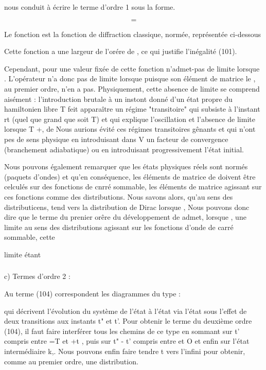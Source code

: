 nous conduit à écrire le terme d'ordre 1 sous la forme.

\[
\tag{103}=
\]

Le fonction  est la fonction de diffraction classique, normée, représentée ci-dessous

%
Cette fonction a une largeur de l'orére de , ce qui justifie
l'inégalité (101).

Cependant, pour une valeur fixée de cette fonction
n'admet-pas de limite lorsque . L'opérateur  n'a donc
pas de limite lorsque  puisque son élément de matrice
le , au premier ordre, n'en a pas. Physiquement,
cette absence de limite se comprend aisément : l'introduction brutale
à un instont donné  d'un état propre  du hamiltonien libre T
feit apparaître un régime "transitoire" qui subsiste à l'instant rt (quel
que grand que soit T) et qui explique l'oscillation et l'absence de limite
lorsque T +, de  Nous aurions évité ces
régimes transitoires gênants et qui n'ont pes de sens physique en introduisant
dans V un facteur de convergence (branchement adiabatique) ou en
introduisant progressivement l'état initial.

Nous pouvons également remarquer que les états physiques réels
sont normés (paquets d'ondes) et qu'en conséquence, les éléments de matrice
de  doivent être celculés sur des fonctions de cnrré sommable,
les éléments de matrice  agissant sur ces fonctions
comme des distributions. Nous savons alors, qu'au sens des distributicens,
 tend vers la distribution de Dirac  lorsque
, Nous pouvons donc dire que le terme du prenier orêre du développement
de  admet, lorsque  , une limite au sens des
distributions agissant sur les fonctions d'onde de carré sommable, cette

limite étant


\subsubsection{}%
c) Termes d'ordre 2 :

Au terme (104) correspondent les diagrammes du type :

qui décrivent l'évolution du système de l'état  à l'état
 via l'état  sous l'effet de deux transitions aux
instants t" et t'. Pour obtenir le terme du deuxième ordre (104),
il faut faire interférer tous les chemins de ce type en sommant
sur t' compris entre =T et +t , puis sur t" - t' compris entre
 et O et enfin sur l'état intermédiaire k,. Nous pouvons enfin
faire tendre t vers l'infini pour obtenir, comme au premier ordre,
une distribution.

